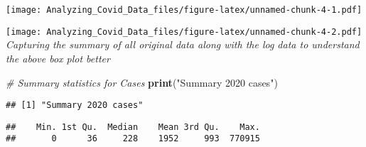 \documentclass[
]{article}
\newenvironment{Shaded}{\begin{snugshade}}{\end{snugshade}}
\newcommand{\CommentTok}[1]{\textcolor[rgb]{0.56,0.35,0.01}{\textit{#1}}}
\newcommand{\FunctionTok}[1]{\textcolor[rgb]{0.13,0.29,0.53}{\textbf{#1}}}
\newcommand{\NormalTok}[1]{#1}
\newcommand{\SpecialCharTok}[1]{\textcolor[rgb]{0.81,0.36,0.00}{\textbf{#1}}}
\newcommand{\StringTok}[1]{\textcolor[rgb]{0.31,0.60,0.02}{#1}}
\begin{document}
\begin{Shaded}
\end{Shaded}

\texttt{[image: Analyzing\_Covid\_Data\_files/figure-latex/unnamed-chunk-4-1.pdf]}

\begin{Shaded}
\end{Shaded}

\texttt{[image: Analyzing\_Covid\_Data\_files/figure-latex/unnamed-chunk-4-2.pdf]}
\emph{Capturing the summary of all original data along with the log data
to understand the above box plot better}

\begin{Shaded}
\begin{Highlighting}[]
\CommentTok{\# Summary statistics for Cases}
\FunctionTok{print}\NormalTok{(}\StringTok{"Summary 2020 cases"}\NormalTok{)}
\end{Highlighting}
\end{Shaded}

\begin{verbatim}
## [1] "Summary 2020 cases"
\end{verbatim}

\begin{Shaded}
\end{Shaded}

\begin{verbatim}
##    Min. 1st Qu.  Median    Mean 3rd Qu.    Max. 
##       0      36     228    1952     993  770915
\end{verbatim}
\end{document}
